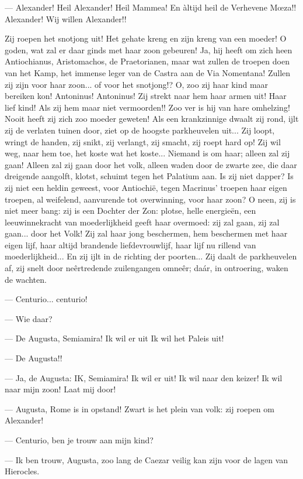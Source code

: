 \documentclass[a4paper, 12pt, oneside, dutch]{article}
\begin{document}
--- Alexander! Heil Alexander! Heil Mammea! En àltijd heil de Verhevene Mœza!! Alexander! Wij willen Alexander!!

Zij roepen het snotjong uit! Het gehate kreng en zijn kreng van een moeder! O goden, wat zal er daar ginds met haar zoon gebeuren! Ja, hij heeft om zich heen Antiochianus, Aristomachos, de Praetorianen, maar wat zullen de troepen doen van het Kamp, het immense leger van de Castra aan de Via Nomentana! Zullen zij zijn voor haar zoon... of voor het snotjong!? O, zoo zij haar kind maar bereiken kon! Antoninus! Antoninus! Zij strekt naar hem haar armen uit! Haar lief kind! Als zij hem maar niet vermoorden!! Zoo ver is hij van hare omhelzing! Nooit heeft zij zich zoo moeder geweten! Als een krankzinnige dwaalt zij rond, ijlt zij de verlaten tuinen door, ziet op de hoogste parkheuvelen uit... Zij loopt, wringt de handen, zij snikt, zij verlangt, zij smacht, zij roept hard op! Zij wil weg, naar hem toe, het koste wat het koste... Niemand is om haar; alleen zal zij gaan! Alleen zal zij gaan door het volk, alleen waden door de zwarte zee, die daar dreigende aangolft, klotst, schuimt tegen het Palatium aan. Is zij niet dapper? Is zij niet een heldin geweest, voor Antiochië, tegen Macrinus' troepen haar eigen troepen, al weifelend, aanvurende tot overwinning, voor haar zoon? O neen, zij is niet meer bang: zij is een Dochter der Zon: plotse, helle energieën, een leeuwinnekracht van moederlijkheid geeft haar overmoed: zij zal gaan, zij zal gaan... door het Volk! Zij zal haar jong beschermen, hem beschermen met haar eigen lijf, haar altijd brandende liefdevrouwlijf, haar lijf nu rillend van moederlijkheid... En zij ijlt in de richting der poorten... Zij daalt de parkheuvelen af, zij snelt door neêrtredende zuilengangen omneêr; daár, in ontroering, waken de wachten.

--- Centurio... centurio!

--- Wie daar?

--- De Augusta, Semiamira! Ik wil er uit Ik wil het Paleis uit!

--- De Augusta!!

--- Ja, de Augusta: IK, Semiamira! Ik wil er uit! Ik wil naar den keizer! Ik wil naar mijn zoon! Laat mij door!

--- Augusta, Rome is in opstand! Zwart is het plein van volk: zij roepen om Alexander!

--- Centurio, ben je trouw aan mijn kind?

--- Ik ben trouw, Augusta, zoo lang de Caezar veilig kan zijn voor de lagen van Hierocles.
\end{document}
